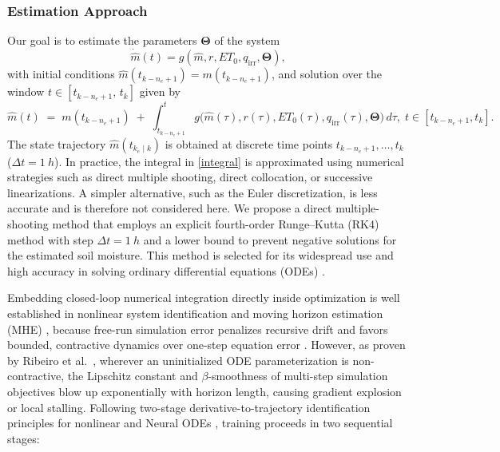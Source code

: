 \documentclass[pdflatex,sn-nature]{sn-jnl}%
\theoremstyle{thmstyleone}%
\theoremstyle{thmstyletwo}%
\theoremstyle{thmstylethree}%
\begin{document}
\subsubsection{Estimation Approach}
Our goal is to estimate the parameters $\boldsymbol{\Theta}$ of the system 
\begin{equation}
    \dot{\hat{m}}(t) = g(\hat{m}, r, ET_0, q_{\mathrm{irr}}, \boldsymbol{\Theta}),
\end{equation}
with initial conditions \(\hat{m}(t_{k-n_e+1}) = m(t_{k-n_e+1})\), and solution over the window \(t \in [t_{k-n_e+1},\, t_k]\) given by
\begin{equation}
\label{integral}
    \hat{m}(t)
  \;=\;
  m(t_{k-n_e+1})\;+\;
  \int_{t_{k-n_e+1}}^{t}
        g\!\bigl(
            \hat{m}(\tau),
            r(\tau),
            ET_0(\tau),
            q_{\mathrm{irr}}(\tau),
            \boldsymbol{\Theta}
          \bigr)\, d\tau,
  \; t\in[t_{k-n_e+1},t_k].
\end{equation}
The state trajectory $ \hat{m}(t_{k_e \mid k}) $ is obtained at discrete time points $ t_{k - n_e + 1}, \dots, t_k $ (\(\Delta t = \SI{1}{h}\)). In practice, the integral in \eqref{integral} is approximated using numerical strategies such as direct multiple shooting, direct collocation, or successive linearizations. A simpler alternative, such as the Euler discretization, is less accurate and is therefore not considered here. We propose a direct multiple-shooting method that employs an explicit fourth-order Runge--Kutta (RK4) method with step \(\Delta t = \SI{1}{h}\) and a lower bound to prevent negative solutions for the estimated soil moisture. This method is selected for its widespread use and high accuracy in solving ordinary differential equations (ODEs) \cite{rawlings2017}.

Embedding closed-loop numerical integration directly inside optimization is well established in nonlinear system identification and moving horizon estimation (MHE) \cite{rawlings2017, Alessandri2017, Verhaegen2007, roffel2007process}, because free-run simulation error penalizes recursive drift and favors bounded, contractive dynamics over one-step equation error \cite{Aguirre2010}. However, as proven by Ribeiro et al.~\cite{Ribeiro2020}, wherever an uninitialized ODE parameterization is non-contractive, the Lipschitz constant and $\beta$-smoothness of multi-step simulation objectives blow up exponentially with horizon length, causing gradient explosion or local stalling. Following two-stage derivative-to-trajectory identification principles for nonlinear and Neural ODEs \cite{Bradley2021, Aguirre2010, Verhaegen2007, condeforecast2024}, training proceeds in two sequential stages:
\end{document}
